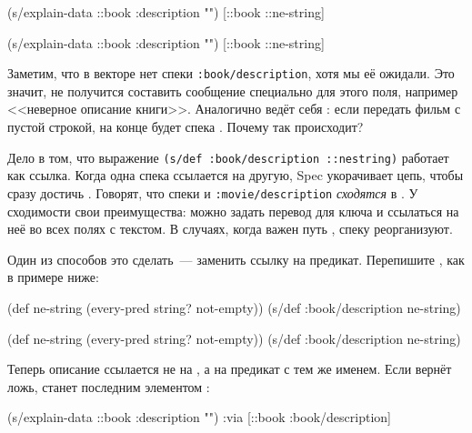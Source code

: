 \ifnarrow

\begin{clojure}
(s/explain-data ::book
  {:description ""})
[::book ::ne-string]
\end{clojure}

\else

\begin{clojure}
(s/explain-data ::book {:description ""})
[::book ::ne-string]
\end{clojure}

\fi

Заметим, что в векторе нет спеки \texttt{:book/de\-scription}, хотя мы её
ожидали. Это значит, не получится составить сообщение специально для этого поля,
например <<неверное описание книги>>. Аналогично ведёт себя : если
передать фильм с пустой строкой, на конце  будет спека
. Почему так происходит?

Дело в том, что выражение \texttt{(s/def :book/de\-scrip\-tion ::ne\-string)}
работает как ссылка. Когда одна спека ссылается на другую, Spec укорачивает
цепь, чтобы сразу достичь . Говорят, что спеки
 и \texttt{:movie/\-de\-scrip\-tion} \emph{сходятся} в
. У сходимости свои преимущества: можно задать перевод для
ключа  и ссылаться на неё во всех полях с текстом. В случаях,
когда важен путь , спеку реорганизуют.

Один из способов это сделать~--- заменить ссылку на предикат. Перепишите
, как в примере ниже:

\ifnarrow

\begin{clojure}
(def ne-string
  (every-pred string? not-empty))
(s/def :book/description ne-string)
\end{clojure}

\else

\begin{clojure}
(def ne-string (every-pred string? not-empty))
(s/def :book/description ne-string)
\end{clojure}

\fi

Теперь описание ссылается не на , а на предикат с тем же
именем. Если  вернёт ложь,  станет
последним элементом :

\ifnarrow

\begin{clojure}
(s/explain-data ::book
  {:description ""})
{:via [::book :book/description]}
\end{clojure}

